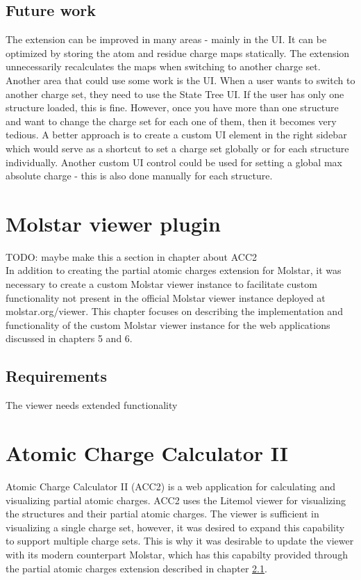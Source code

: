 \documentclass[
  digital,     %
  oneside,     %
  nosansbold,  %
  nocolorbold, %
  lof,         %
  lot,         %
]{fithesis4}
\begin{document}
\section{Future work}

The extension can be improved in many areas - mainly in the UI. It can be optimized by storing the atom and residue charge maps statically. The extension unnecessarily recalculates the maps when switching to another charge set. Another area that could use some work is the UI. When a user wants to switch to another charge set, they need to use the State Tree UI. If the user has only one structure loaded, this is fine. However, once you have more than one structure and want to change the charge set for each one of them, then it becomes very tedious. A better approach is to create a custom UI element in the right sidebar which would serve as a shortcut to set a charge set globally or for each structure individually. Another custom UI control could be used for setting a global max absolute charge - this is also done manually for each structure.

\chapter{Molstar viewer plugin}

TODO: maybe make this a section in chapter about ACC2 \\

In addition to creating the partial atomic charges extension for Molstar, it was necessary to create a custom Molstar viewer instance to facilitate custom functionality not present in the official Molstar viewer instance deployed at molstar.org/viewer. This chapter focuses on describing the implementation and functionality of the custom Molstar viewer instance for the web applications discussed in chapters 5 and 6.

\section{Requirements}

The viewer needs extended functionality

\chapter{Atomic Charge Calculator II}
\label{chapter:atomic_charge_calculator_ii}

Atomic Charge Calculator II (ACC2) is a web application for calculating and visualizing partial atomic charges. ACC2 uses the Litemol viewer for visualizing the structures and their partial atomic charges. The viewer is sufficient in visualizing a single charge set, however, it was desired to expand this capability to support multiple charge sets. This is why it was desirable to update the viewer with its modern counterpart Molstar, which has this capabilty provided through the partial atomic charges extension described in chapter \ref{}.
\end{document}
